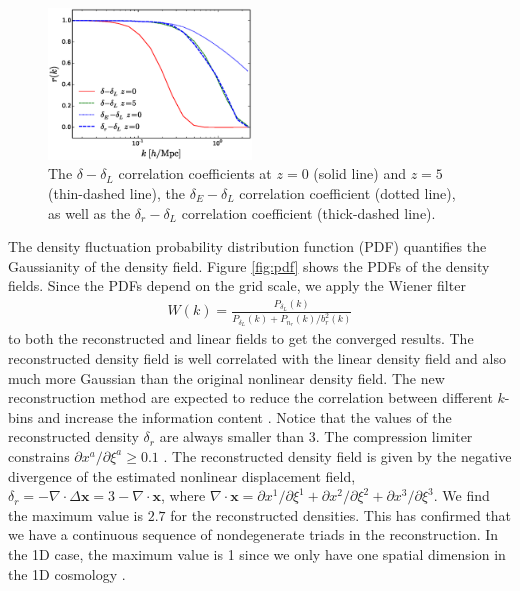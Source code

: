 \documentclass[aps,prl,twocolumn,showpacs,superscriptaddress,groupedaddress,nofootinbib]{revtex4}  %
\newcommand{\bea}{\begin{eqnarray}}
\newcommand{\eea}{\end{eqnarray}}
\begin{document}
\begin{figure}[tbp]
\begin{center}
\includegraphics[width=0.48\textwidth]{f3.eps}
\end{center}
\vspace{-0.7cm}
\caption{
The $\delta-\delta_L$ correlation coefficients at $z=0$ (solid
line) and $z=5$ (thin-dashed line), the $\delta_E-\delta_L$ correlation
coefficient (dotted line), as well as the $\delta_r-\delta_L$
correlation coefficient (thick-dashed line).}
    
\label{fig:xcc}
\end{figure}

The density fluctuation probability distribution function (PDF) quantifies 
the Gaussianity of the density field. 
Figure \ref{fig:pdf} shows the PDFs of the density fields. 
Since the PDFs depend on the grid scale, we apply the Wiener filter
\bea
W(k)=\frac{P_{\delta_L}(k)}{P_{\delta_L}(k)+P_{n_r}(k)/b_r^2(k)}
\eea
to both the reconstructed and linear fields to get the converged results.
The reconstructed density field is well correlated with the linear density 
field and also much more Gaussian than the original nonlinear density field.
The new reconstruction method are expected to reduce the correlation between
different $k$-bins and increase the information content
\cite{1999MNRAS.308.1179M,1999ApJ...527....1S,2005MNRAS.360L..82R}.
Notice that the values of the reconstructed density $\delta_r$ are always
smaller than 3. 
The compression limiter constrains $\partial x^a/\partial\xi^a\geq0.1$ 
\cite{1995ApJS..100..269P,1998ApJS..115...19P}.
The reconstructed density field is given by the negative
divergence of the estimated nonlinear displacement field,
$\delta_r=-\nabla\cdot\Delta{\bm{x}}=3-\nabla\cdot\bm{x}$,
where $\nabla\cdot\bm{x}=\partial x^1/\partial\xi^1+\partial x^2/\partial\xi^2
+\partial x^3/\partial\xi^3$. 
We find the maximum value is $2.7$ for the reconstructed densities.  
This has confirmed that we have a continuous sequence of 
nondegenerate triads in the reconstruction. 
In the 1D case, the maximum value is 1 since we only have one spatial dimension
in the 1D cosmology \cite{2016arXiv160907041Z}.
\end{document}
